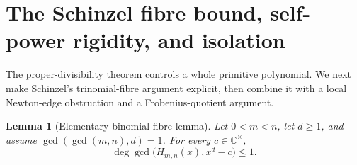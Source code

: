 \documentclass[11pt]{article}
\newtheorem{lemma}[theorem]{Lemma}
\theoremstyle{definition}
\newcommand{\C}{\mathbb C}
\begin{document}
\section{The Schinzel fibre bound, self-power rigidity, and isolation}
\label{sec:kummer}

The proper-divisibility theorem controls a whole primitive polynomial.  We
next make Schinzel's trinomial-fibre argument explicit, then combine it with a
local Newton-edge obstruction and a Frobenius-quotient argument.

\begin{lemma}[Elementary binomial-fibre lemma]\label{lem:schinzelfibre}
Let \(0<m<n\), let \(d\geq1\), and assume
\(\gcd(\gcd(m,n),d)=1\).  For every \(c\in\C^\times\),
\[
 \deg\gcd\bigl(H_{m,n}(x),x^d-c\bigr)\leq1.
\]
\end{lemma}
\end{document}
